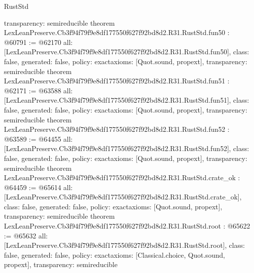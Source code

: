 \begin{lexlean}{RustStd}
\begin{coremodule}
{  transparency: semireducible
}
theorem LexLeanPreserve.Cb3f94f79f9e8df177550f627f92bd8d2.R31.RustStd.fun50 : @60791 := @62170 {
  all: [LexLeanPreserve.Cb3f94f79f9e8df177550f627f92bd8d2.R31.RustStd.fun50],
  class: false,
  generated: false,
  policy: exact{axioms: [Quot.sound, propext]},
  transparency: semireducible
}
theorem LexLeanPreserve.Cb3f94f79f9e8df177550f627f92bd8d2.R31.RustStd.fun51 : @62171 := @63588 {
  all: [LexLeanPreserve.Cb3f94f79f9e8df177550f627f92bd8d2.R31.RustStd.fun51],
  class: false,
  generated: false,
  policy: exact{axioms: [Quot.sound, propext]},
  transparency: semireducible
}
theorem LexLeanPreserve.Cb3f94f79f9e8df177550f627f92bd8d2.R31.RustStd.fun52 : @63589 := @64455 {
  all: [LexLeanPreserve.Cb3f94f79f9e8df177550f627f92bd8d2.R31.RustStd.fun52],
  class: false,
  generated: false,
  policy: exact{axioms: [Quot.sound, propext]},
  transparency: semireducible
}
theorem LexLeanPreserve.Cb3f94f79f9e8df177550f627f92bd8d2.R31.RustStd.crate_ok : @64459 := @65614 {
  all: [LexLeanPreserve.Cb3f94f79f9e8df177550f627f92bd8d2.R31.RustStd.crate_ok],
  class: false,
  generated: false,
  policy: exact{axioms: [Quot.sound, propext]},
  transparency: semireducible
}
theorem LexLeanPreserve.Cb3f94f79f9e8df177550f627f92bd8d2.R31.RustStd.root : @65622 := @65632 {
  all: [LexLeanPreserve.Cb3f94f79f9e8df177550f627f92bd8d2.R31.RustStd.root],
  class: false,
  generated: false,
  policy: exact{axioms: [Classical.choice, Quot.sound, propext]},
  transparency: semireducible
}


\end{coremodule}
\end{lexlean}
